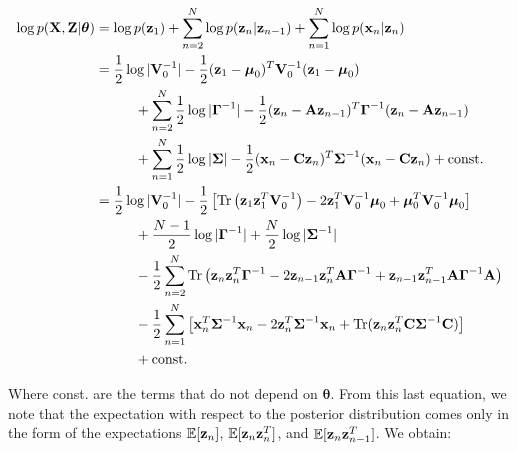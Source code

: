 \documentclass[11pt]{article}
\begin{document}
\begin{align}
	\log p({\bf X}, {\bf Z}\vert \boldsymbol\theta) &= \log p({\bf z}_1) + \sum_{n=2}^N \log p({\bf z}_n\vert {\bf z}_{n-1}) + \sum_{n=1}^N \log p({\bf x}_n\vert {\bf z}_n)\\
	   &=\frac{1}{2}\log\vert{\bf V}_0^{-1}\vert - \frac{1}{2}({\bf z}_1 - \boldsymbol\mu_0)^T{\bf V}_0^{-1}({\bf z}_1 - \boldsymbol\mu_0) \nonumber \\
	   &\hspace{1cm}+ \sum_{n=2}^N \frac{1}{2}\log\vert\boldsymbol\Gamma^{-1}\vert - \frac{1}{2}({\bf z}_n - {\bf A z}_{n-1})^T\boldsymbol{\Gamma}^{-1}({\bf z}_n - {\bf A z}_{n-1}) \nonumber \\
	   &\hspace{1cm}+\sum_{n=1}^N \frac{1}{2}\log\vert\boldsymbol\Sigma\vert -\frac{1}{2}({\bf x}_n - {\bf C z}_n)^T \boldsymbol{\Sigma}^{-1}({\bf x}_n - {\bf C z}_n) + \text{const.}\\
	   &= \frac{1}{2}\log \vert
	  {\bf V}_0^{-1}\vert -\frac{1}{2}\left[\text{Tr}\left({\bf z}_1 {\bf z}_1^T {\bf V}_0^{-1}\right) -2 {\bf z}_1^T{\bf V}_0^{-1}\boldsymbol\mu_0 + \boldsymbol\mu_0^T {\bf V}_0^{-1}\boldsymbol\mu_0\right] \nonumber \\
	  &\hspace{1cm}+ \frac{N-1}{2}\log\vert\boldsymbol\Gamma^{-1}\vert + \frac{N}{2}\log\vert \boldsymbol\Sigma^{-1}\vert \nonumber \\
	  &\hspace{1cm}-\frac{1}{2} \sum_{n=2}^{N}\text{Tr}\left({\bf z}_n{\bf z}_n^T\boldsymbol\Gamma^{-1} -2 {\bf z}_{n-1}{\bf z}_n^T{\bf A}\boldsymbol\Gamma^{-1} +  {\bf z}_{n-1}{\bf z}_{n-1}^T{\bf A}\boldsymbol\Gamma^{-1}{\bf A}\right) \nonumber\\
	  &\hspace{1cm}-\frac{1}{2}\sum_{n=1}^N\left[{\bf x}_n^T\boldsymbol{\Sigma}^{-1}{\bf x}_n-2{\bf z}_n^T\boldsymbol\Sigma^{-1}{\bf x}_n + \text{Tr}({\bf z}_n{\bf z}_n^T{\bf C}\boldsymbol\Sigma^{-1}{\bf C})\right] \nonumber\\
	  &\hspace{1cm} + \text{const.}
\end{align}

Where const. are the terms that do not depend on $\boldsymbol{\theta}$. From this last equation, we note that the expectation with respect to the posterior distribution comes only in the form of the expectations $\mathbb{E}[{\bf z}_n]$, $\mathbb{E}[{\bf z}_n{\bf z}_{n}^{T}]$, and  $\mathbb{E}[{\bf z}_n{\bf z}_{n-1}^{T}]$. We obtain:
\end{document}

